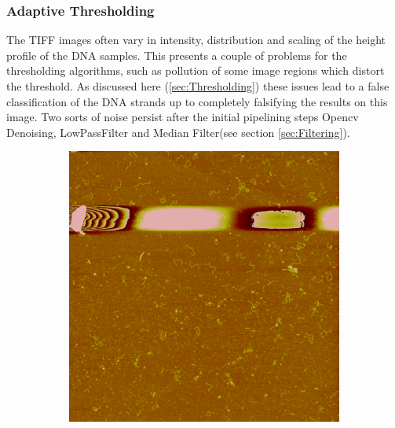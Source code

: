 \documentclass{article}
\begin{document}
\subsubsection{Adaptive Thresholding}
The TIFF images often vary in intensity, distribution and scaling of the height profile of the DNA samples. This presents a couple of problems for the thresholding algorithms, such as pollution of some image regions which distort the threshold. As discussed here (\ref{sec:Thresholding}) these issues lead to a false classification of the DNA strands up to completely falsifying the results on this image.
Two sorts of noise persist after the initial pipelining steps  
Opencv Denoising, LowPassFilter and Median Filter(see section \ref{sec:Filtering}).
\begin{figure}[!htb]
	\begin{subfigure}{0.5\textwidth}
		\includegraphics[width=\linewidth]{noise1.png}
		\caption{}
		\label{fig: Noise1}
	\end{subfigure}%
	\hspace{\fill}
	\begin{subfigure}{0.5\textwidth}

\end{subfigure}
\end{figure}
\end{document}
